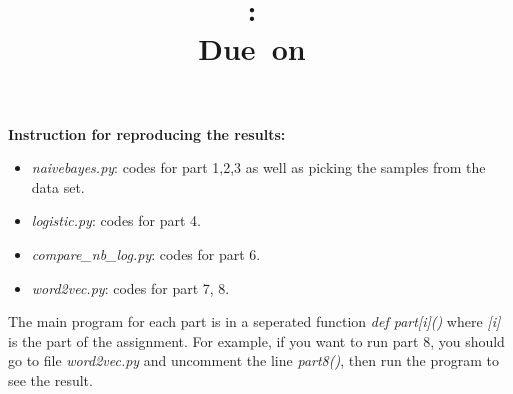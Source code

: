\documentclass{article}
\title{
\vspace{2in}
\textmd{\textbf{\hmwkClass:\ \hmwkTitle}}\\
\normalsize\vspace{0.1in}\small{Due\ on\ \hmwkDueDate}\\
\vspace{0.1in}
\vspace{3in}
}
\author{\textbf{\hmwkAuthorName}}
\begin{document}
\maketitle
\clearpage

\textbf{Instruction for reproducing the results:}
\begin{itemize}
\item \textit{naivebayes.py}: codes for part 1,2,3 as well as picking the samples from the data set.
\item \textit{logistic.py}: codes for part 4. 
\item \textit{compare\_nb\_log.py}: codes for part 6.
\item \textit{word2vec.py}: codes for part 7, 8.
\end{itemize}
The main program for each part is in a seperated function \textit{def part[i]()} where \textit{[i]} is the part of the assignment. For example, if you want to run part 8, you should go to file \textit{word2vec.py} and uncomment the line \textit{part8()}, then run the program to see the result. 
\end{document}

